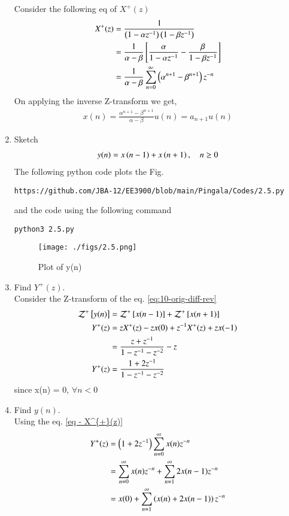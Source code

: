 \documentclass[journal,12pt,twocolumn]{IEEEtran}
\renewcommand\thesection{\arabic{section}}
\begin{document}
\begin{enumerate}[label=\thesection.\arabic*,ref=\thesection.\theenumi]
\solution Consider the following eq of $X^{+}(z)$
\begin{align}
X^{+}(z) &= \frac{1}{\left(1-\alpha z^{-1}\right)\left(1-\beta z^{-1}\right)}\\
&= \frac{1}{\alpha - \beta} {}\left[\frac{\alpha}{1-\alpha z^{-1}} - \frac{\beta}{1-\beta z^{-1}}\right]\\ &= \frac{1}{\alpha - \beta} \sum_{n=0}^{\infty} \left({\alpha}^{n+1} - {\beta}^{n+1}\right) z^{-n}
\end{align}
On applying the inverse Z-transform we get,
\begin{align}
x(n) = \frac{{\alpha}^{n+1} - {\beta}^{n+1}}{\alpha - \beta} u(n) = a_{n+1} u(n)
\label{eq:xn}
\end{align}
\item Sketch 
\begin{align}
	y(n)	 = x\left(n-1\right) + x\left(n+1\right),  \quad n \ge 0
	\label{eq:10-orig-diff-rev}
\end{align}
\solution The following python code plots the Fig.
\begin{lstlisting}
https://github.com/JBA-12/EE3900/blob/main/Pingala/Codes/2.5.py
\end{lstlisting}
and the code using the following command 
\begin{lstlisting}
python3 2.5.py
\end{lstlisting}
\begin{figure}[!htbp]
\centering
\texttt{[image: ./figs/2.5.png]}
\caption{Plot of y(n)}
\label{fig-2.5}	
\end{figure}
\item Find $Y^{+}(z)$.\\ 
\solution Consider the Z-transform of the eq. \ref{eq:10-orig-diff-rev}
\begin{align}
\mathcal{Z}^{+}{}\left[y(n)\right] &= \mathcal{Z}^{+}{}\left[x(n-1)\right] + \mathcal{Z}^{+}{}\left[x(n+1)\right]\\ {Y}^{+}(z) &= zX^{+}(z) - zx(0) + z^{-1}X^{+}(z) + zx(-1)\\ &= \frac{z+z^{-1}}{1-z^{-1}-z^{-2}} - z\\ Y^{+}(z) &= \frac{1+2z^{-1}}{1-z^{-1}-z^{-2}}
\end{align}
since x(n) = 0, $\forall n<0$
\item Find $y(n)$.\\
\solution Using the eq. \ref{eq - X^{+}(z)}
\begin{align}
Y^{+}(z) &= \brak{1+2z^{-1}} \sum_{n=0}^{\infty} x(n) z^{-n}\\ &= \sum_{n=0}^{\infty} x(n) z^{-n} + \sum_{n=1}^{\infty} 2x(n-1) z^{-n}\\ &= x(0) + \sum_{n=1}^{\infty} \brak{x(n) + 2x(n-1)} z^{-n}

\end{align}
\end{enumerate}
\end{document}
